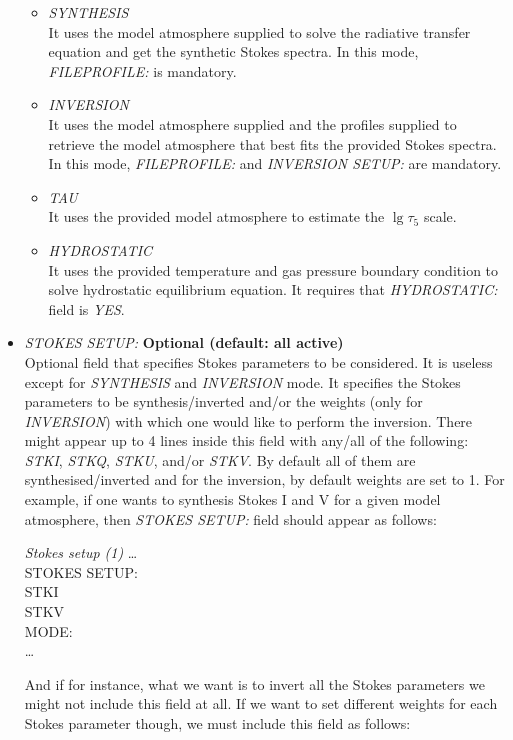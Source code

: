 \begin{itemize}
\begin{itemize}
    \item {\it SYNTHESIS}\\
    It uses the model atmosphere supplied to solve the radiative transfer equation and get the synthetic Stokes spectra. In this mode, {\it FILEPROFILE:} is mandatory.
    \item {\it INVERSION}\\
    It uses the model atmosphere supplied and the profiles supplied to retrieve the model atmosphere that best fits the provided Stokes spectra. In this mode, {\it FILEPROFILE:} and {\it INVERSION SETUP:} are mandatory.
    \item {\it TAU}\\
    It uses the provided model atmosphere to estimate the $\lg\tau_{5}$ scale.
    \item {\it HYDROSTATIC}\\
    It uses the provided temperature and gas pressure boundary condition to solve hydrostatic equilibrium equation. It requires that {\it HYDROSTATIC:} field is {\it YES}.
  \end{itemize}
  \item {\it STOKES SETUP:} {\bf Optional (default: all active)}\\
  Optional field that specifies Stokes parameters to be considered. 
  It is useless except for {\it SYNTHESIS} and {\it INVERSION} mode. It specifies the Stokes parameters to be synthesis/inverted and/or the weights (only for {\it INVERSION}) with which one would like to perform the inversion. There might appear up to 4 lines inside this field with any/all of the following: {\it STKI}, {\it STKQ}, {\it STKU}, and/or {\it STKV}. By default all of them are synthesised/inverted and for the inversion, by default weights are set to 1. For example, if one wants to synthesis Stokes I and V for a given model atmosphere, then {\it STOKES SETUP:} field should appear as follows:\\
\begin{ifbox}[label={tb:stokes_setup1}]{{\it Stokes setup (1)}}
  \scriptsize
  \ldots\\
  STOKES SETUP:\\
  STKI\\
  STKV\\
  MODE:\\
  \ldots
  \normalsize
\end{ifbox}
  And if for instance, what we want is to invert all the Stokes parameters we might not include this field at all. If we want to set different weights for each Stokes parameter though, we must include this field as follows:\\

\end{itemize}
